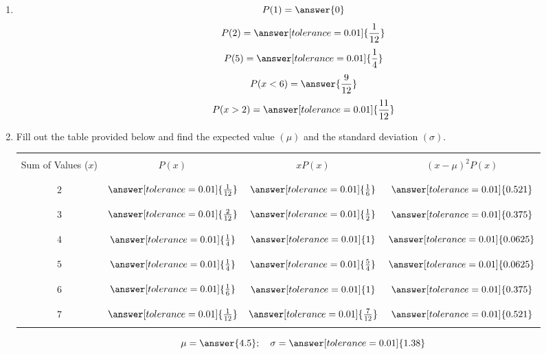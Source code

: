 \documentclass{ximera}
\begin{document}
\begin{problem}
\begin{enumerate}
    
\item $$P(1)=\answer{0}$$ $$P(2)=\answer[tolerance=0.01]{\frac{1}{12}}$$ $$P(5)=\answer[tolerance=0.01]{\frac{1}{4}}$$ $$P(x<6)=\answer{\frac{9}{12}}$$ $$P(x>2)=\answer[tolerance=0.01]{\frac{11}{12}}$$


\item Fill out the table provided below and find the expected value $(\mu)$ and the standard deviation $(\sigma)$.

\begin{center}
\begin{tabular}{|c|c|c|c|}
 \hline
 && &   \\
 Sum of Values ($x$) & $P(x)$& $xP(x)$ &$(x-\mu)^2P(x)$ \\
 && &   \\
  \hline
  && & \\
 \quad$2$\quad&$\answer[tolerance=0.01]{\frac{1}{12}}$&$\answer[tolerance=0.01]{\frac{1}{6}}$&$\answer[tolerance=0.01]{0.521}$ \\
  &&& \\
 \hline
  &&& \\
 \quad $3$&$\answer[tolerance=0.01]{\frac{2}{12}}$&$\answer[tolerance=0.01]{\frac{1}{2}}$ & $\answer[tolerance=0.01]{0.375}$ \\
  &&& \\
 \hline
  &&& \\
  \quad $4$&$\answer[tolerance=0.01]{\frac{1}{4}}$& $\answer[tolerance=0.01]{1}$ &$\answer[tolerance=0.01]{0.0625}$ \\
  &&& \\
 \hline
  & &&\\
 \quad $5$& $\answer[tolerance=0.01]{\frac{1}{4}}$&$\answer[tolerance=0.01]{\frac{5}{4}}$  & $\answer[tolerance=0.01]{0.0625}$\\
  &&&\\
 \hline
  & &&\\
 \quad $6$&$\answer[tolerance=0.01]{\frac{1}{6}}$ & $\answer[tolerance=0.01]{1}$ & $\answer[tolerance=0.01]{0.375}$\\
  &&&\\
 \hline
 & &&\\
 \quad $7$&$\answer[tolerance=0.01]{\frac{1}{12}}$ & $\answer[tolerance=0.01]{\frac{7}{12}}$ & $\answer[tolerance=0.01]{0.521}$\\
  &&&\\
 \hline
\end{tabular}
\end{center}
\vskip 0.5in
$$\mu=\answer{4.5};\quad \sigma =\answer[tolerance=0.01]{1.38}$$
\end{enumerate}

\end{problem}
\end{document}
